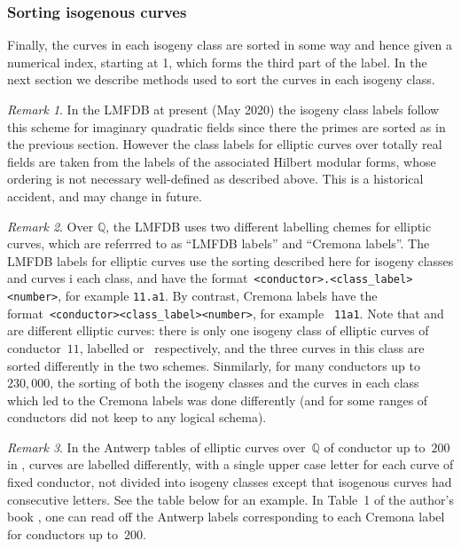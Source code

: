\documentclass{article}
\theoremstyle{remark}
\newtheorem{rem}{Remark}
\def\Q{{\mathbb Q}}
\newcommand{\lmfdbecLMFDB}[3]{\href{http://www.lmfdb.org/EllipticCurve/Q/#1.#2#3}{{\text{\rm#1.#2#3}}}}
\newcommand{\lmfdbecCremona}[3]{\href{http://www.lmfdb.org/EllipticCurve/Q/#1#2#3}{{\text{\rm#1#2#3}}}}
\newcommand{\lmfdbecisoLMFDB}[2]{\href{http://www.lmfdb.org/EllipticCurve/Q/#1.#2}{\text{\rm#1.#2}}}
\newcommand{\lmfdbecisoCremona}[2]{\href{http://www.lmfdb.org/EllipticCurve/Q/#1#2}{\text{\rm#1#2}}}
\begin{document}
\subsubsection{Sorting isogenous curves} Finally, the curves in each
isogeny class are sorted in some way and hence given a numerical
index, starting at 1, which forms the third part of the label.  In the
next section we describe methods used to sort the curves in each
isogeny class.

\begin{rem} In the LMFDB at present (May 2020) the isogeny class
labels follow this scheme for imaginary quadratic fields since there
the primes are sorted as in the previous section.  However the class
labels for elliptic curves over totally real fields are taken from the
labels of the associated Hilbert modular forms, whose ordering is not
necessary well-defined as described above.  This is a historical
accident, and may change in future.
\end{rem}
\begin{rem} Over $\Q$, the LMFDB uses two different labelling chemes
  for elliptic curves, which are referrred to as ``LMFDB labels'' and
  ``Cremona labels''.  The LMFDB labels for elliptic curves use the
  sorting described here for isogeny classes and curves i each class,
  and have the format~{\tt <conductor>.<class\_label><number>}, for
  example {\tt 11.a1}.  By contrast, Cremona labels have the
  format~{\tt <conductor><class\_label><number>}, for example {\tt
    11a1}.  Note that \lmfdbecLMFDB{11}{a}{1}
  and~\lmfdbecCremona{11}{a}{1} are different elliptic curves: there
  is only one isogeny class of elliptic curves of conductor~$11$,
  labelled \lmfdbecisoLMFDB{11}{a} or~\lmfdbecisoCremona{11}{a}
  respectively, and the three curves in this class are sorted
  differently in the two schemes.  Sinmilarly, for many conductors up
  to $230,000$, the sorting of both the isogeny classes and the curves
  in each class which led to the Cremona labels was done differently
  (and for some ranges of conductors did not keep to any logical
  schema).
\end{rem}
\begin{rem}
In the Antwerp tables of elliptic curves over~$\Q$ of conductor up
to~$200$ in \cite{AntwerpIV}, curves are labelled differently, with a
single upper case letter for each curve of fixed conductor, not
divided into isogeny classes except that isogenous curves had
consecutive letters.  See the table below for an example.  In Table~1
of the author's book \cite{JCbook2}, one can read off the Antwerp
labels corresponding to each Cremona label for conductors up to~$200$.
\end{rem}
\end{document}
